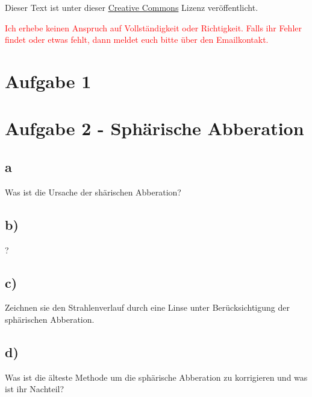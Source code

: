 




\maketitle

Dieser Text ist unter dieser \href{http://creativecommons.org/licenses/by-nc-sa/4.0/}{Creative Commons} Lizenz veröffentlicht.

\textcolor{red}{Ich erhebe keinen Anspruch auf Vollständigkeit oder Richtigkeit. Falls ihr Fehler findet oder etwas fehlt, dann meldet euch bitte über den Emailkontakt.}

\tableofcontents


\newpage



\section{Aufgabe 1}



\section{Aufgabe 2 - Sphärische Abberation}

\subsection*{a}

Was ist die Ursache der shärischen Abberation?

\subsection*{b)}

?

\subsection*{c)}

Zeichnen sie den Strahlenverlauf durch eine Linse unter Berücksichtigung der sphärischen Abberation.

\subsection*{d)}

Was ist die älteste Methode um die sphärische Abberation zu korrigieren und was ist ihr Nachteil?

